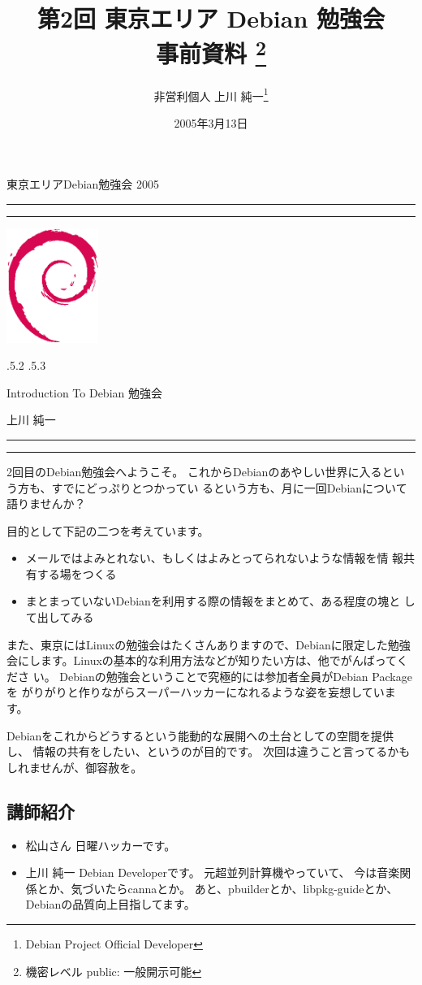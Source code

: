 \documentclass[mingoth]{jsarticle}
\makeatletter
\renewcommand{\section}{\@startsection{section}{1}{\z@}%
    {\Cvs \@plus.5\Cdp \@minus.2\Cdp}%
    {.5\Cvs \@plus.3\Cdp}%
    {\normalfont\Large\headfont\raggedright\centering}} %
\newcommand{\dancersection}[2]{%
\newpage
東京エリアDebian勉強会 2005
\hrule
\vspace{0.5mm}
\hrule
\hfill{}\includegraphics[width=3cm]{image200502/openlogo-nd.eps}\\
\vspace{-4cm}
\begin{center}
  \section{#1}
\end{center}
\hfill{}#2\hspace{3cm}\space\\
\hrule
\hrule
\vspace{1cm}
}
\makeatother
\begin{document}
\begin{titlepage}

\title{
 第2回 東京エリア Debian 勉強会\\事前資料
\footnote{機密レベル public: 一般開示可能}}
\date{2005年3月13日}
\author{非営利個人 上川 純一\thanks{Debian Project Official Developer}} 
\maketitle

\end{titlepage}

\newpage
\tableofcontents

\dancersection{Introduction To Debian 勉強会}{上川 純一}

2回目のDebian勉強会へようこそ。
これからDebianのあやしい世界に入るという方も、すでにどっぷりとつかってい
るという方も、月に一回Debianについて語りませんか？

目的として下記の二つを考えています。

\begin{itemize}
 \item メールではよみとれない、もしくはよみとってられないような情報を情
       報共有する場をつくる
 \item まとまっていないDebianを利用する際の情報をまとめて、ある程度の塊と
       して出してみる
\end{itemize}

また、東京にはLinuxの勉強会はたくさんありますので、Debianに限定した勉強
会にします。Linuxの基本的な利用方法などが知りたい方は、他でがんばってくださ
い。
Debianの勉強会ということで究極的には参加者全員がDebian Packageを
がりがりと作りながらスーパーハッカーになれるような姿を妄想しています。

Debianをこれからどうするという能動的な展開への土台としての空間を提供し、
情報の共有をしたい、というのが目的です。
次回は違うこと言ってるかもしれませんが、御容赦を。

\subsection{講師紹介}

\begin{itemize}
 \item{松山さん} 日曜ハッカーです。
 \item{上川 純一} Debian Developerです。
      元超並列計算機やっていて、
      今は音楽関係とか、気づいたらcannaとか。
      あと、pbuilderとか、libpkg-guideとか、Debianの品質向上目指してます。
\end{itemize}
\end{document}
